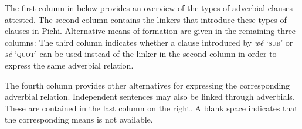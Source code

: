 The first column in  below provides an overview of the types of adverbial clauses attested. The second column contains the linkers that introduce these types of clauses in Pichi. Alternative means of formation are given in the remaining three columns: The third column indicates whether a clause introduced by \textit{wé} ‘\textsc{sub}’ or \textit{sé} ‘\textsc{quot}’ can be used instead of the linker in the second column in order to express the same adverbial relation. 



The fourth column provides other alternatives for expressing the corresponding adverbial relation. Independent sentences may also be linked through adverbials. These are contained in the last column on the right. A blank space indicates that the corresponding means is not available. 


